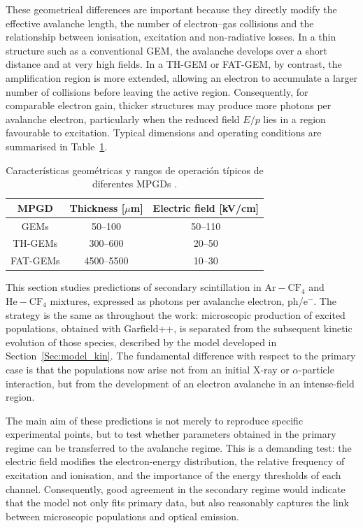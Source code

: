 \documentclass[12pt,a4paper]{article}
\newcommand{\He}{\mathrm{He}}
\newcommand{\Ar}{\mathrm{Ar}}
\newcommand{\CF}{\mathrm{CF}}
\begin{document}
These geometrical differences are important because they directly modify the effective avalanche length, the number of electron--gas collisions and the relationship between ionisation, excitation and non-radiative losses. In a thin structure such as a conventional GEM, the avalanche develops over a short distance and at very high fields. In a TH-GEM or FAT-GEM, by contrast, the amplification region is more extended, allowing an electron to accumulate a larger number of collisions before leaving the active region. Consequently, for comparable electron gain, thicker structures may produce more photons per avalanche electron, particularly when the reduced field $E/p$ lies in a region favourable to excitation. Typical dimensions and operating conditions are summarised in Table~\ref{tab:mgpd}.

\begin{table}[h!]
\centering
\begin{tabular}{ccc}
\toprule
MPGD & Thickness [$\mu$m] & Electric field [kV/cm]  \\
\midrule
GEMs     & 50--100     & 50--110  \\
TH-GEMs  & 300--600    & 20--50   \\
FAT-GEMs & 4500--5500  & 10--30   \\
\bottomrule
\end{tabular}
\caption{Características geométricas y rangos de operación típicos de diferentes MPGDs \cite{williams2024fatgems,azevedo2016thgem,fraga2003the}.}
\label{tab:mgpd}
\end{table}

This section studies predictions of secondary scintillation in $\Ar-\CF_4$ and $\He-\CF_4$ mixtures, expressed as photons per avalanche electron, ph/e$^-$. The strategy is the same as throughout the work: microscopic production of excited populations, obtained with Garfield++, is separated from the subsequent kinetic evolution of those species, described by the model developed in Section~\ref{Sec:model_kin}. The fundamental difference with respect to the primary case is that the populations now arise not from an initial X-ray or $\alpha$-particle interaction, but from the development of an electron avalanche in an intense-field region.

The main aim of these predictions is not merely to reproduce specific experimental points, but to test whether parameters obtained in the primary regime can be transferred to the avalanche regime. This is a demanding test: the electric field modifies the electron-energy distribution, the relative frequency of excitation and ionisation, and the importance of the energy thresholds of each channel. Consequently, good agreement in the secondary regime would indicate that the model not only fits primary data, but also reasonably captures the link between microscopic populations and optical emission.
\end{document}

